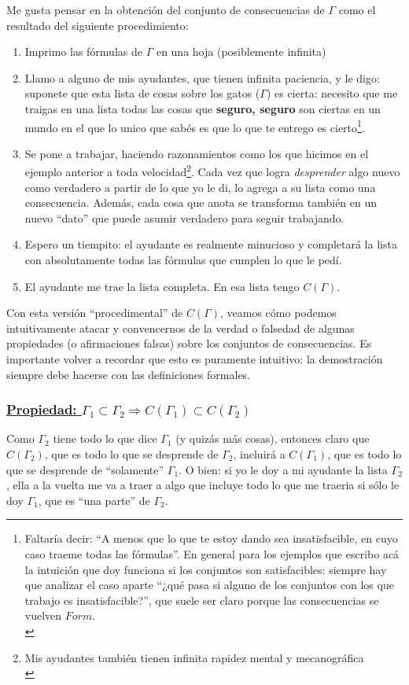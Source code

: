 \documentclass[10pt,a4paper]{article}
\newcommand{\G}{\Gamma}
\newcommand{\Ra}{\Rightarrow}
\begin{document}
Me gusta pensar en la obtención del conjunto de consecuencias de $\G$ como el resultado del siguiente procedimiento:

\begin{enumerate}
\item Imprimo las fórmulas de $\G$ en una hoja (posiblemente infinita)
\item Llamo a alguno de mis ayudantes, que tienen infinita paciencia, y le digo: suponete que esta lista de cosas sobre los gatos ($\G$) es cierta: necesito que me traigas en una lista todas las cosas que \textbf{seguro, seguro} son ciertas en un mundo en el que lo unico que sabés es que lo que te entrego es cierto\footnote{Faltaría decir: ``A menos que lo que te estoy dando sea insatisfacible, en cuyo caso traeme todas las fórmulas''. En general para los ejemplos que escribo acá la intuición que doy funciona si los conjuntos son satisfacibles: siempre hay que analizar el caso aparte ``¿qué pasa si alguno de los conjuntos con los que trabajo es insatisfacible?'', que suele ser claro porque las consecuencias se vuelven $Form$.\\}. 
\item Se pone a trabajar, haciendo razonamientos como los que hicimos en el ejemplo anterior a toda velocidad\footnote{Mis ayudantes también tienen infinita rapidez mental y mecanográfica\\}. Cada vez que logra \textit{desprender} algo nuevo como verdadero a partir de lo que yo le di, lo agrega a su lista como una consecuencia. Además, cada cosa que anota se transforma también en un nuevo ``dato'' que puede asumir verdadero para seguir trabajando.
\item Espero un tiempito: el ayudante es realmente minucioso y completará la lista con absolutamente todas las fórmulas que cumplen lo que le pedí.
\item El ayudante me trae la lista completa. En esa lista tengo $C(\G)$.
\end{enumerate}


Con esta versión ``procedimental'' de $C(\G)$, veamos cómo podemos intuitivamente atacar y convencernos de la verdad o falsedad de algunas propiedades (o afirmaciones falsas) sobre los conjuntos de consecuencias. Es importante volver a recordar que esto es puramente intuitivo: la demostración siempre debe hacerse con las definiciones formales.


\subsubsection*{\underline{Propiedad: $\G_1 \subset \G_2 \Ra C(\G_1) \subset C(\G_2)$}}
Como $\G_2$ tiene todo lo que dice $\G_1$ (y quizás más cosas), entonces claro que $C(\G_2)$, que es todo lo que se desprende de $\G_2$, incluirá a $C(\G_1)$, que es todo lo que se desprende de ``solamente'' $\G_1$. O bien: si yo le doy a mi ayudante la lista $\G_2$, ella a la vuelta me va a traer a algo que incluye todo lo que me traeria si sólo le doy $\G_1$, que es ``una parte'' de $\G_2$.
\vspace{20px}
\end{document}
